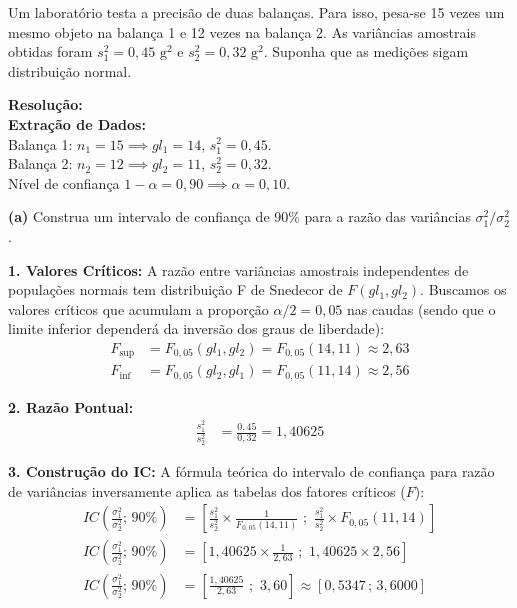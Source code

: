 \documentclass[12pt, a4paper]{article}
\begin{document}
Um laboratório testa a precisão de duas balanças. Para isso, pesa-se 15 vezes um mesmo objeto na balança 1 e 12 vezes na balança 2. As variâncias amostrais obtidas foram $s^2_1 = 0{,}45 \text{ g}^2$ e $s^2_2 = 0{,}32 \text{ g}^2$. Suponha que as medições sigam distribuição normal.

\vspace{0.3cm}
\noindent\textbf{Resolução:}\\
\textbf{Extração de Dados:} \\
Balança 1: $n_1 = 15 \implies gl_1 = 14$, $s^2_1 = 0,45$. \\
Balança 2: $n_2 = 12 \implies gl_2 = 11$, $s^2_2 = 0,32$. \\
Nível de confiança $1-\alpha = 0,90 \implies \alpha = 0,10$.

\medskip\noindent\textbf{(a)} Construa um intervalo de confiança de 90\% para a razão das variâncias $\sigma^2_1 / \sigma^2_2$.

\noindent \textbf{1. Valores Críticos:} A razão entre variâncias amostrais independentes de populações normais tem distribuição F de Snedecor de $F(gl_1, gl_2)$. Buscamos os valores críticos que acumulam a proporção $\alpha/2 = 0,05$ nas caudas (sendo que o limite inferior dependerá da inversão dos graus de liberdade):
\begin{align*}
F_{\text{sup}} &= F_{0,05}(gl_1, gl_2) = F_{0,05}(14, 11) \approx 2,63 \\
F_{\text{inf}} &= F_{0,05}(gl_2, gl_1) = F_{0,05}(11, 14) \approx 2,56
\end{align*}

\noindent \textbf{2. Razão Pontual:}
\begin{align*}
\frac{s^2_1}{s^2_2} &= \frac{0,45}{0,32} = \boxed{1,40625}
\end{align*}

\noindent \textbf{3. Construção do IC:}
A fórmula teórica do intervalo de confiança para razão de variâncias inversamente aplica as tabelas dos fatores críticos ($F$):
\begin{align*}
IC\left(\frac{\sigma_1^2}{\sigma_2^2}; \, 90\%\right) &= \left[ \frac{s^2_1}{s^2_2} \times \frac{1}{F_{0,05}(14, 11)} \,\,;\,\, \frac{s^2_1}{s^2_2} \times F_{0,05}(11, 14) \right] \\
IC\left(\frac{\sigma_1^2}{\sigma_2^2}; \, 90\%\right) &= \left[ 1,40625 \times \frac{1}{2,63} \,\,;\,\, 1,40625 \times 2,56 \right] \\
IC\left(\frac{\sigma_1^2}{\sigma_2^2}; \, 90\%\right) &= \left[ \frac{1,40625}{2,63} \,\,;\,\, 3,60 \right] \approx \boxed{[0,5347 \,;\, 3,6000]}
\end{align*}
\end{document}
